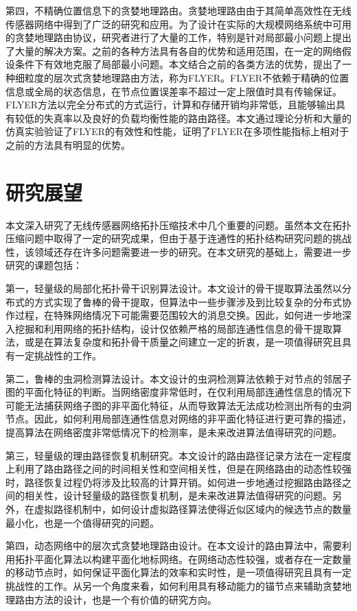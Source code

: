 第四，不精确位置信息下的贪婪地理路由。贪婪地理路由由于其简单高效性在无线传感器网络中得到了广泛的研究和应用。为了设计在实际的大规模网络系统中可用的贪婪地理路由协议，研究者进行了大量的工作，特别是针对局部最小问题上提出了大量的解决方案。之前的各种方法具有各自的优势和适用范围，在一定的网络假设条件下有效地克服了局部最小问题。本文结合之前的各类方法的优势，提出了一种细粒度的层次式贪婪地理路由方法，称为FLYER。FLYER不依赖于精确的位置信息或全局的状态信息，在节点位置误差率不超过一定上限值时具有传输保证。FLYER方法以完全分布式的方式运行，计算和存储开销均非常低，且能够输出具有较低的失真率以及良好的负载均衡性能的路由路径。本文通过理论分析和大量的仿真实验验证了FLYER的有效性和性能，证明了FLYER在多项性能指标上相对于之前的方法具有明显的优势。
\section{研究展望}
本文深入研究了无线传感器网络拓扑压缩技术中几个重要的问题。虽然本文在拓扑压缩问题中取得了一定的研究成果，但由于基于连通性的拓扑结构研究问题的挑战性，该领域还存在许多问题需要进一步的研究。在本文研究的基础上，需要进一步研究的课题包括：

第一，轻量级的局部化拓扑骨干识别算法设计。本文设计的骨干提取算法虽然以分布式的方式实现了鲁棒的骨干提取，但算法中一些步骤涉及到比较复杂的分布式协作过程，在特殊网络情况下可能需要范围较大的消息交换。因此，如何进一步地深入挖掘和利用网络的拓扑结构，设计仅依赖严格的局部连通性信息的骨干提取算法，或是在算法复杂度和拓扑骨干质量之间建立一定的折衷，是一项值得研究且具有一定挑战性的工作。

第二，鲁棒的虫洞检测算法设计。本文设计的虫洞检测算法依赖于对节点的邻居子图的平面化特征的判断。当网络密度非常低时，在仅利用局部连通性信息的情况下可能无法捕获网络子图的非平面化特征，从而导致算法无法成功检测出所有的虫洞节点。因此，如何利用局部连通性信息对网络的非平面化特征进行更可靠的描述，提高算法在网络密度非常低情况下的检测率，是未来改进算法值得研究的问题。

第三，轻量级的理由路径恢复机制研究。本文设计的路由路径记录方法在一定程度上利用了路由路径之间的时间相关性和空间相关性，但是在网络路由的动态性较强时，路径恢复过程仍将涉及比较高的计算开销。如何进一步地通过挖掘路由路径之间的相关性，设计轻量级的路径恢复机制，是未来改进算法值得研究的问题。另外，在虚拟路径机制中，如何设计虚拟路径算法使得近似区域内的候选节点的数量最小化，也是一个值得研究的问题。

第四，动态网络中的层次式贪婪地理路由设计。在本文设计的路由算法中，需要利用拓扑平面化算法以构建平面化地标网络。在网络动态性较强，或者存在一定数量的移动节点时，如何保证平面化算法的效率和实时性，是一项值得研究且具有一定挑战性的工作。从另一个角度来看，如何利用具有移动能力的锚节点来辅助贪婪地理路由方法的设计，也是一个有价值的研究方向。
